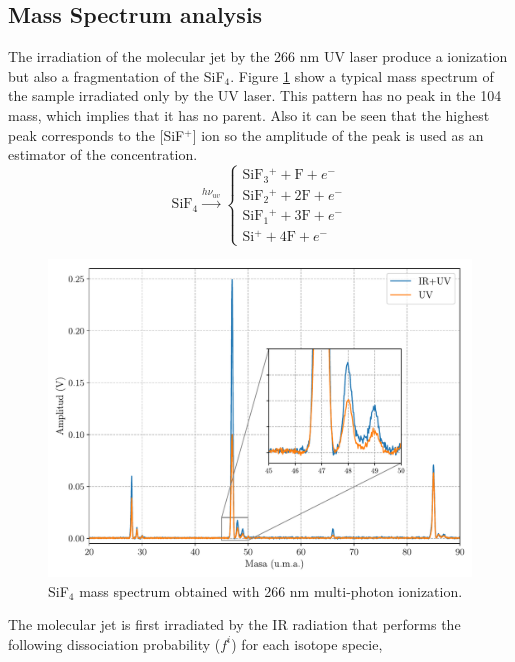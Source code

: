 \documentclass[global,twocolumn]{svjour}
\begin{document}
\subsection{Mass Spectrum analysis}
The irradiation of the molecular jet by the 266 nm UV laser produce a ionization but also a fragmentation of the SiF$_{4}$. Figure \ref{fig:spec_uv} show a typical mass spectrum of the sample irradiated only by the UV laser. This pattern has no peak in the 104 mass, which implies that it has no parent. Also it can be seen that the highest peak corresponds to the [SiF$^{+}$] ion so the amplitude of the peak is used as an estimator of the concentration.     
\begin{equation}
\text{SiF$_{4}$} \xrightarrow{h \nu_{uv}}
\begin{cases}
\text{SiF$_{3}$$^{+}$} + \text{F} + e^{-} \\
\text{SiF$_{2}$$^{+}$} + \text{2F} + e^{-} \\
\text{SiF$_{1}$$^{+}$} + \text{3F} + e^{-} \\
\text{Si$^{+}$} + \text{4F} + e^{-}
\end{cases}
\end{equation}

\begin{figure}[h]
	\includegraphics[width =1\linewidth]{figures/sp_uv_ir.pdf}
	\caption{\label{fig:spec_uv} SiF$_{4}$ mass spectrum obtained with 266 nm multi-photon ionization.}
\end{figure}

The molecular jet is first irradiated by the IR radiation that performs the following dissociation probability ($f^{i}$) for each isotope specie,
\end{document}
